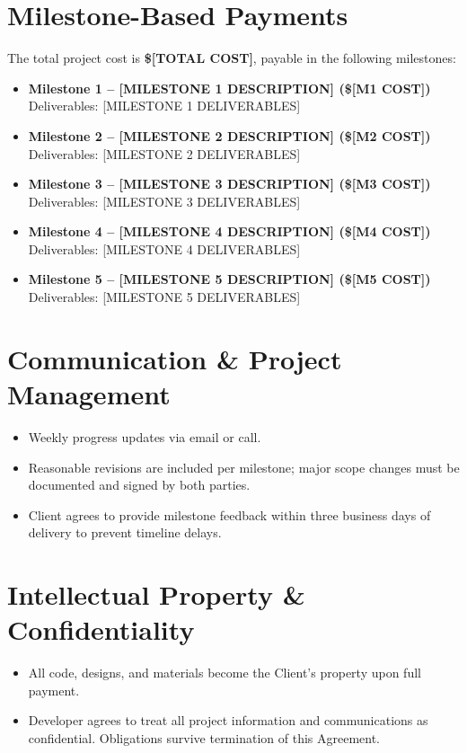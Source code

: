 \documentclass[11pt,letterpaper]{article}
\newcommand{\TotalCost}{[TOTAL COST]}
\newcommand{\MilestoneOne}{[MILESTONE 1 DESCRIPTION]}
\newcommand{\MOneCost}{[M1 COST]}
\newcommand{\MOneDeliverables}{[MILESTONE 1 DELIVERABLES]}
\newcommand{\MilestoneTwo}{[MILESTONE 2 DESCRIPTION]}
\newcommand{\MTwoCost}{[M2 COST]}
\newcommand{\MTwoDeliverables}{[MILESTONE 2 DELIVERABLES]}
\newcommand{\MilestoneThree}{[MILESTONE 3 DESCRIPTION]}
\newcommand{\MThreeCost}{[M3 COST]}
\newcommand{\MThreeDeliverables}{[MILESTONE 3 DELIVERABLES]}
\newcommand{\MilestoneFour}{[MILESTONE 4 DESCRIPTION]}
\newcommand{\MFourCost}{[M4 COST]}
\newcommand{\MFourDeliverables}{[MILESTONE 4 DELIVERABLES]}
\newcommand{\MilestoneFive}{[MILESTONE 5 DESCRIPTION]}
\newcommand{\MFiveCost}{[M5 COST]}
\newcommand{\MFiveDeliverables}{[MILESTONE 5 DELIVERABLES]}
\begin{document}
\section{Milestone-Based Payments}
The total project cost is \textbf{\$\TotalCost{}}, payable in the following milestones:

\begin{itemize}[leftmargin=*]
\item \textbf{Milestone 1 -- \MilestoneOne{} (\$\MOneCost{})}\\
Deliverables: \MOneDeliverables{}

\item \textbf{Milestone 2 -- \MilestoneTwo{} (\$\MTwoCost{})}\\
Deliverables: \MTwoDeliverables{}

\item \textbf{Milestone 3 -- \MilestoneThree{} (\$\MThreeCost{})}\\
Deliverables: \MThreeDeliverables{}

\item \textbf{Milestone 4 -- \MilestoneFour{} (\$\MFourCost{})}\\
Deliverables: \MFourDeliverables{}

\item \textbf{Milestone 5 -- \MilestoneFive{} (\$\MFiveCost{})}\\
Deliverables: \MFiveDeliverables{}
\end{itemize}

\section{Communication \& Project Management}
\begin{itemize}[leftmargin=*]
\item Weekly progress updates via email or call.
\item Reasonable revisions are included per milestone; major scope changes must be documented and signed by both parties.
\item Client agrees to provide milestone feedback within three business days of delivery to prevent timeline delays.
\end{itemize}

\section{Intellectual Property \& Confidentiality}
\begin{itemize}[leftmargin=*]
\item All code, designs, and materials become the Client's property upon full payment.
\item Developer agrees to treat all project information and communications as confidential. Obligations survive termination of this Agreement.
\end{itemize}
\end{document}
